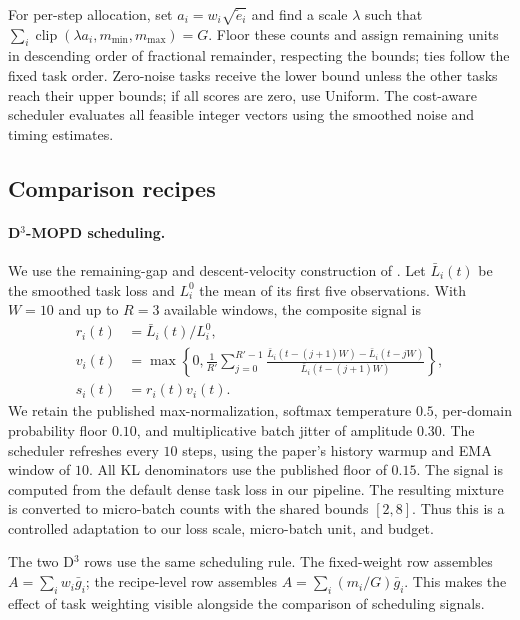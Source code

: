 For per-step allocation, set $a_i=w_i\sqrt{\widetilde e_i}$ and find
a scale $\lambda$ such that
$\sum_i\operatorname{clip}(\lambda a_i,m_{\min},m_{\max})=G$.
Floor these counts and assign remaining units in descending order
of fractional remainder, respecting the bounds; ties follow the
fixed task order. Zero-noise tasks receive the lower bound unless
the other tasks reach their upper bounds; if all scores are zero,
use Uniform. The cost-aware scheduler evaluates all feasible integer
vectors using the smoothed noise and timing estimates.

\subsection{Comparison recipes}
\label{app:baselines}

\paragraph{D$^3$-MOPD scheduling.}
We use the remaining-gap and descent-velocity construction of
\citet{sun2026d3mopd}. Let $\bar L_i(t)$ be the smoothed task loss
and $L_i^0$ the mean of its first five observations. With $W=10$
and up to $R=3$ available windows, the composite signal is
\begin{equation}
\begin{split}
    r_i(t)&=\bar L_i(t)/L_i^0,\\
    v_i(t)&=\max\left\{0,\frac1{R'}
       \sum_{j=0}^{R'-1}
       \frac{\bar L_i(t-(j+1)W)-\bar L_i(t-jW)}
            {\bar L_i(t-(j+1)W)}\right\},\\
    s_i(t)&=r_i(t)v_i(t).
\end{split}
\end{equation}
We retain the published max-normalization, softmax temperature $0.5$,
per-domain probability floor $0.10$, and multiplicative batch jitter
of amplitude $0.30$. The scheduler refreshes every $10$ steps,
using the paper's history warmup and EMA window of $10$.
All KL denominators use the published floor of $0.15$.
The signal is computed from the default dense task loss in our pipeline.
The resulting mixture is converted to micro-batch counts with the
shared bounds $[2,8]$. Thus this is a controlled adaptation to our loss
scale, micro-batch unit, and budget.

The two D$^3$ rows use the same scheduling rule. The fixed-weight
row assembles $A=\sum_iw_i\bar g_i$; the recipe-level row assembles
$A=\sum_i(m_i/G)\bar g_i$. This makes the effect of task weighting
visible alongside the comparison of scheduling signals.

